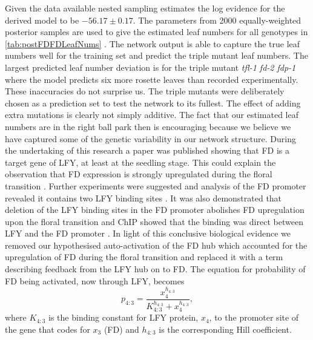 Given the data available nested sampling estimates the log evidence for the derived model to be $-56.17\pm 0.17$.
The parameters from 2000 equally-weighted posterior samples are used to give the estimated leaf numbers for all genotypes in \autoref{tab:postFDFDLeafNums}
.
The network output is able to capture the true leaf numbers well for the training set and predict the triple mutant leaf numbers.
The largest predicted leaf number deviation is for the triple mutant \emph{tfl-1 fd-2 fdp-1} where the model predicts six more rosette leaves than recorded experimentally.
These inaccuracies do not surprise us.
The triple mutants were deliberately chosen as a prediction set to test the network to its fullest.
The effect of adding extra mutations is clearly not simply additive. 
The fact that our estimated leaf numbers are in the right ball park then is encouraging because we believe we have captured some of the genetic variability in our network structure.
During the undertaking of this research a paper was published \cite{winter2011} showing that FD is a target gene of LFY, at least at the seedling stage.
This could explain the observation that FD expression is strongly upregulated during the floral transition \cite{wigge2005}.
Further experiments were suggested and analysis of the FD promoter revealed it contains two LFY binding sites \cite{jaeger2013}.
It was also demonstrated that deletion of the LFY binding sites in the FD promoter abolishes FD upregulation upon the floral transition and ChIP showed that the binding was direct between LFY and the FD promoter \cite{jaeger2013}.
In light of this conclusive biological evidence we removed our hypothesised auto-activation of the FD hub which accounted for the upregulation of FD during the floral transition and replaced it with a term describing feedback from the LFY hub on to FD.
The equation for probability of FD being activated, now through LFY, becomes
\begin{equation*}
p_{4:3} = \frac{x_{4}^{h_{4:3}}}
{K_{4:3}^{h_{4:3}}+x_{4}^{h_{4:3}}},
\end{equation*}
where $K_{4:3}$ is the binding constant for LFY protein, $x_{4}$, to the promoter site of the gene that codes for $x_3$ (FD) and $h_{4:3}$ is the corresponding Hill coefficient.

